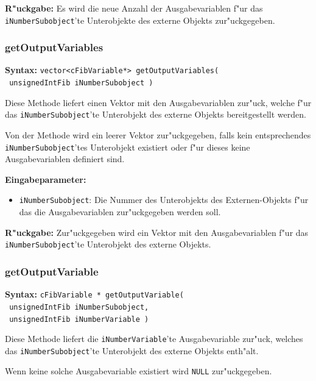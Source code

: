 \bigskip\noindent
\textbf{R"uckgabe:} Es wird die neue Anzahl der Ausgabevariablen f"ur das \verb|iNumberSubobject|'te Unterobjekte des externe Objekts zur"uckgegeben.


\subsubsection{getOutputVariables}

\textbf{Syntax:} \verb|vector<cFibVariable*> getOutputVariables(| \\\verb| unsignedIntFib iNumberSubobject )|

\bigskip\noindent
Diese Methode liefert einen Vektor mit den Ausgabevariablen zur"uck, welche f"ur das \verb|iNumberSubobject|'te Unterobjekt des externe Objekts bereitgestellt werden.

Von der Methode wird ein leerer Vektor zur"uckgegeben, falls kein entsprechendes \verb|iNumberSubobject|'tes Unterobjekt existiert oder f"ur dieses keine Ausgabevariablen definiert sind.

\bigskip\noindent
\textbf{Eingabeparameter:}
\begin{itemize}
 \item \verb|iNumberSubobject|: Die Nummer des Unterobjekts des Externen-Objekts f"ur das die Ausgabevariablen zur"uckgegeben werden soll.
\end{itemize}

\bigskip\noindent
\textbf{R"uckgabe:} Zur"uckgegeben wird ein Vektor mit den Ausgabevariablen f"ur das \verb|iNumberSubobject|'te Unterobjekt des externe Objekts.


\subsubsection{getOutputVariable}

\textbf{Syntax:} \verb|cFibVariable * getOutputVariable(| \\\verb| unsignedIntFib iNumberSubobject,| \\\verb| unsignedIntFib iNumberVariable )|

\bigskip\noindent
Diese Methode liefert die \verb|iNumberVariable|'te Ausgabevariable zur"uck, welches das \verb|iNumberSubobject|'te Unterobjekt des externe Objekts enth"alt.

Wenn keine solche Ausgabevariable existiert wird \verb|NULL| zur"uckgegeben.

